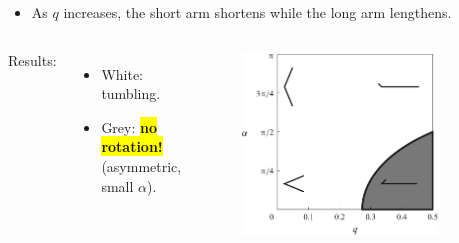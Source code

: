 \documentclass{beamer}
\newcommand{\bi}{\begin{itemize}}
\newcommand{\ei}{\end{itemize}}
\begin{document}
\begin{frame}
\begin{overlayarea}{\textwidth}{\textheight}
\vspace{0.1cm} \small
\bi
\item As $q$ increases, the short arm shortens while the long arm lengthens.
\ei  \vspace{-0.15cm}
		\begin{columns}
			Results:
			\bi
			\item White: tumbling. \item Grey: \colorbox{yellow}{\textbf{no rotation!}} 
			 (asymmetric, small $\alpha$). 
			\ei 
			\begin{figure}[htb]
				\begin{center}
					\includegraphics[width=0.85\textwidth]{plots/stone.png}
				\end{center}
			\end{figure}
		\end{columns}
	\end{overlayarea}
\end{frame}

\end{document}
